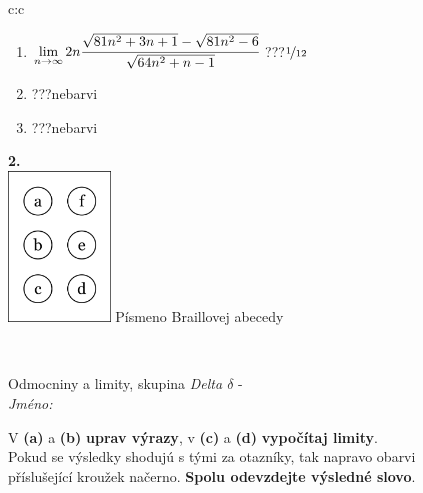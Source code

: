 \documentclass[10pt]{report}
\begin{document}
\begin{tabular}{c:c}
\begin{minipage}[c][104.5mm][t]{0.5\linewidth}
\begin{center}
\begin{minipage}{0.79\linewidth}
\begin{center}
\begin{varwidth}{\linewidth}
\begin{enumerate}
\item $\lim\limits_{n\to\infty}2n\cfrac{\sqrt{81n^2+3n+1}-\sqrt{81n^2-6}}{\sqrt{64n^2+n-1}}$\quad \dotfill\; ???\;\dotfill \quad $\nicefrac{1}{12}$
\item \quad \dotfill\; ???\;\dotfill \quad nebarvi
\item \quad \dotfill\; ???\;\dotfill \quad nebarvi
\end{enumerate}
\end{varwidth}
\end{center}
\end{minipage}
\begin{minipage}{0.20\linewidth}
\begin{center}
{\Huge\bfseries 2.} \\[2mm]
\includegraphics[height=40mm]{../images/braille.png}
{\small Písmeno Braillovej abecedy}
\end{center}
\end{minipage}
\end{center}
\end{minipage}
\\ \hdashline
\begin{minipage}[c][104.5mm][t]{0.5\linewidth}
\begin{center}
\vspace{7mm}
{\huge Odmocniny a limity, skupina \textit{Delta $\delta$} -}\\[5mm]
\textit{Jméno:}\phantom{xxxxxxxxxxxxxxxxxxxxxxxxxxxxxxxxxxxxxxxxxxxxxxxxxxxxxxxxxxxxxxxxx}\\[5mm]
\begin{minipage}{0.95\linewidth}
\begin{center}
V \textbf{(a)} a \textbf{(b)} \textbf{uprav výrazy}, v \textbf{(c)} a \textbf{(d)} \textbf{vypočítaj limity}.\\Pokud se výsledky shodujú s tými za otazníky, tak napravo obarvi\\příslušející kroužek načerno. \textbf{Spolu odevzdejte výsledné slovo}.
\end{center}
\end{minipage}
\\[1mm]

\end{center}
\end{minipage}
\end{tabular}
\end{document}
